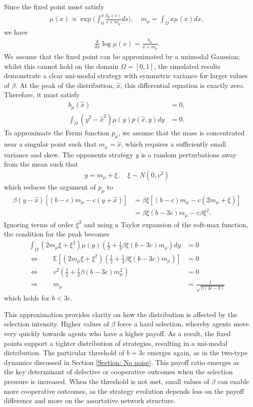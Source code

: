 \documentclass[10pt]{article}
\begin{document}
Since the fixed point must satisfy
\begin{align*}
    \mu(x) \propto \exp\bigg(\int_0^x \frac{b_\mu(s)}{s+m_\mu} ds\bigg),\quad  m_\mu = \int_\Omega x \mu(x) dx,
\end{align*}
we have
\begin{align*}
    \frac{d}{dx}\log\mu(x) = \frac{b_\mu}{x+m_\mu}.
\end{align*}
We assume that the fixed point can be approximated by a unimodal Gaussian; whilst this cannot hold on the domain $\Omega= [0,1]$, the simulated results demonstrate a clear uni-modal strategy with symmetric variance for larger values of $\beta$. At the peak of the distribution, $\hat{x}$, this differential equation is exactly zero. Therefore, it must satisfy
\begin{align*}
    b_\mu(\hat{x})&=0,\\
    \int_\Omega (y^2-\hat{x}^2)\mu(y)p(\hat{x},y) dy &= 0.
\end{align*}
To approximate the Fermi function $p_\mu$, we assume that the mass is concentrated near a singular point such that $m_\mu =\hat{x}$, which requires a sufficiently small variance and skew. The opponents strategy $y$ is a random perturbations away from the mean such that 
\begin{align*}
    y = m_\mu + \xi,\quad  \xi \sim N(0,v^2)
\end{align*}
which reduces the argument of $p_\mu$ to
\begin{align*}
    \beta(y-\hat{x})[(b-c)m_\mu - c(y+\hat{x})] &= \beta \xi [(b-c)m_\mu -c(2m_\mu+\xi)]\\
    &=\beta\xi(b-3c)m_\mu - c\beta\xi^2.
\end{align*}
Ignoring terms of order $\xi^2$ and using a Taylor expansion of the soft-max function, the condition for the peak becomes
\begin{align*}
    \int_\Omega (2m_\mu\xi + \xi^2)\mu(y)(\frac{1}{2} + \frac{1}{4}\beta\xi(b-3c)m_\mu) dy &= 0\\
    \Leftrightarrow\qquad \mathbb{E}[(2m_\mu\xi + \xi^2)(\frac{1}{2} + \frac{1}{4}\beta\xi(b-3c)m_\mu)] &= 0\\
    \Leftrightarrow\qquad v^2(\frac{1}{2} + \frac{1}{2}\beta(b-3c)m^2_\mu ) &=0\\
   \Rightarrow\qquad m_\mu &= \frac{1}{\sqrt{\beta(3c-b)}}
\end{align*}
which holds for $b<3c$.


This approximation provides clarity on how the distribution is affected by the selection intensity. Higher values of $\beta$ force a hard selection, whereby agents move very quickly towards agents who have a higher payoff. As a result, the fixed points support a tighter distribution of strategies, resulting in a uni-modal distribution. The particular threshold of $b=3c$ emerges again, as in the two-type dynamics discussed in Section \ref{Section: No noise}. This payoff ratio emerges as the key determinant of defective or cooperative outcomes when the selection pressure is increased. When the threshold is not met, small values of $\beta$ can enable more cooperative outcomes, as the strategy evolution depends less on the payoff difference and more on the assortative network structure. 
\end{document}
